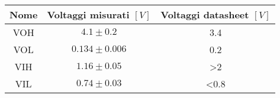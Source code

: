 \begin{tabular}{ccc}
\hline
	Nome & Voltaggi misurati $[V]$ & Voltaggi datasheet $[V]$\\ 
\hline
	VOH & $4.1\pm0.2$ & 3.4 \\
	VOL & $0.134\pm0.006$ & 0.2 \\
	VIH & $1.16\pm0.05$ & >2 \\
	VIL & $0.74\pm0.03$ & <0.8 \\
\hline
\end{tabular}
